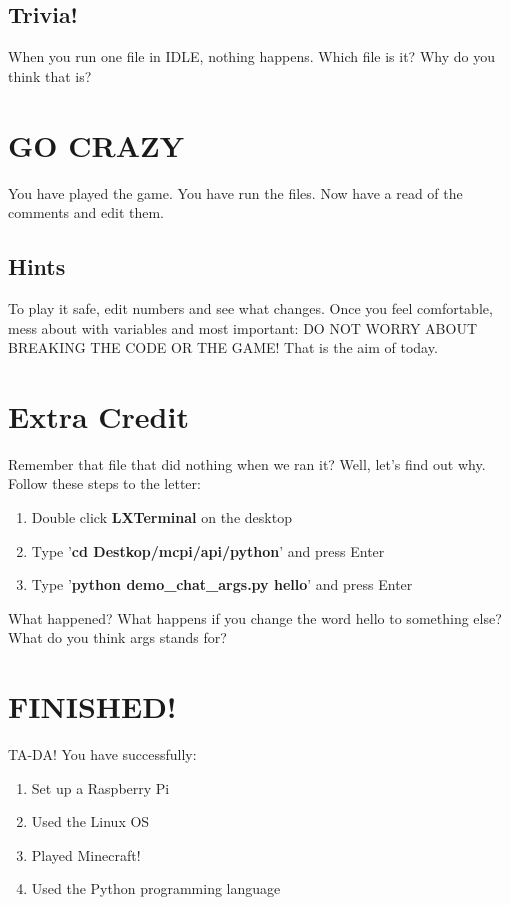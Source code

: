 \documentclass[]{paper}
\begin{document}
\subsection{Trivia!}
When you run one file in IDLE, nothing happens. Which file is it? Why do you think that is?

\section{GO CRAZY}
You have played the game. You have run the files. Now have a read of the comments and edit them.

\subsection*{Hints}
To play it safe, edit numbers and see what changes. Once you feel comfortable, mess about with variables and most important: DO NOT WORRY ABOUT BREAKING THE CODE OR THE GAME! That is the aim of today.

\section{Extra Credit}
Remember that file that did nothing when we ran it? Well, let's find out why. Follow these steps to the letter:
\begin{enumerate}
	\item Double click \textbf{LXTerminal} on the desktop
	\item Type '\textbf{cd Destkop/mcpi/api/python}' and press Enter
	\item Type '\textbf{python demo\_chat\_args.py hello}' and press Enter
\end{enumerate}
What happened? What happens if you change the word hello to something else? What do you think args stands for?

\section*{FINISHED!}
TA-DA! You have successfully:
\begin{enumerate}
	\item Set up a Raspberry Pi
	\item Used the Linux OS
	\item Played Minecraft!
	\item Used the Python programming language
\end{enumerate}
\end{document}
